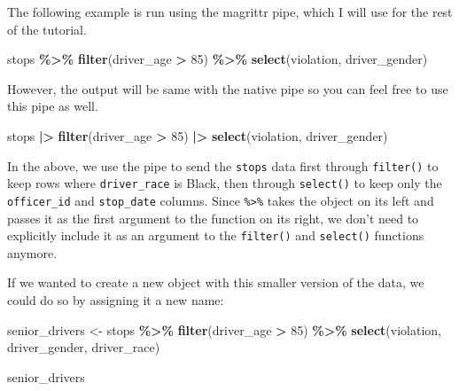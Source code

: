 \documentclass[
]{book}
\newenvironment{Shaded}{\begin{snugshade}}{\end{snugshade}}
\newcommand{\DecValTok}[1]{\textcolor[rgb]{0.00,0.00,0.81}{#1}}
\newcommand{\FunctionTok}[1]{\textcolor[rgb]{0.13,0.29,0.53}{\textbf{#1}}}
\newcommand{\NormalTok}[1]{#1}
\newcommand{\OtherTok}[1]{\textcolor[rgb]{0.56,0.35,0.01}{#1}}
\newcommand{\SpecialCharTok}[1]{\textcolor[rgb]{0.81,0.36,0.00}{\textbf{#1}}}
\begin{document}
The following example is run using the magrittr pipe, which I will use for the rest of the tutorial.

\begin{Shaded}
\begin{Highlighting}[]
\NormalTok{stops }\SpecialCharTok{\%\textgreater{}\%}
  \FunctionTok{filter}\NormalTok{(driver\_age }\SpecialCharTok{\textgreater{}} \DecValTok{85}\NormalTok{) }\SpecialCharTok{\%\textgreater{}\%}
  \FunctionTok{select}\NormalTok{(violation, driver\_gender)}
\end{Highlighting}
\end{Shaded}

However, the output will be same with the native pipe so you can feel free to use this pipe as well.

\begin{Shaded}
\begin{Highlighting}[]
\NormalTok{stops }\SpecialCharTok{|\textgreater{}}
  \FunctionTok{filter}\NormalTok{(driver\_age }\SpecialCharTok{\textgreater{}} \DecValTok{85}\NormalTok{) }\SpecialCharTok{|\textgreater{}}
  \FunctionTok{select}\NormalTok{(violation, driver\_gender)}
\end{Highlighting}
\end{Shaded}

In the above, we use the pipe to send the \texttt{stops} data first through
\texttt{filter()} to keep rows where \texttt{driver\_race} is Black, then through \texttt{select()}
to keep only the \texttt{officer\_id} and \texttt{stop\_date} columns. Since \texttt{\%\textgreater{}\%} takes
the object on its left and passes it as the first argument to the function on
its right, we don't need to explicitly include it as an argument to the
\texttt{filter()} and \texttt{select()} functions anymore.

If we wanted to create a new object with this smaller version of the data, we
could do so by assigning it a new name:

\begin{Shaded}
\begin{Highlighting}[]
\NormalTok{senior\_drivers }\OtherTok{\textless{}{-}}\NormalTok{ stops }\SpecialCharTok{\%\textgreater{}\%}
  \FunctionTok{filter}\NormalTok{(driver\_age }\SpecialCharTok{\textgreater{}} \DecValTok{85}\NormalTok{) }\SpecialCharTok{\%\textgreater{}\%}
  \FunctionTok{select}\NormalTok{(violation, driver\_gender, driver\_race)}

\NormalTok{senior\_drivers}
\end{Highlighting}
\end{Shaded}
\end{document}
